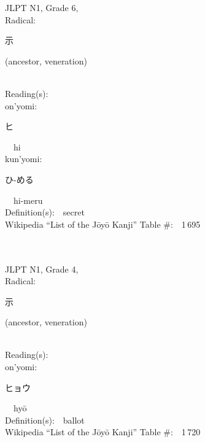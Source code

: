 \begin{multicols}{2}
{JLPT N1, Grade 6, \\Radical:\ \ {\begin{CJK}{UTF8}{min} 示 \end{CJK}} (ancestor, veneration) } \\
Reading(s):\ \ \\
{\hspace*{1em}}on'yomi:\ \ \\
{\hspace*{2em}}{\begin{CJK}{UTF8}{min} ヒ \end{CJK}}\ \ hi\ \ \\
{\hspace*{1em}}kun'yomi:\ \ \\
{\hspace*{2em}}{\begin{CJK}{UTF8}{min} ひ-める \end{CJK}}\ \ hi-meru\ \ \\
Definition(s):\ \ secret \\
Wikipedia ``List of the J\=oy\=o Kanji'' Table \#:\ \ 1\,695 \\
\ \ \\
{\fontsize{34pt}{40pt}  }\ \ \\  %
{JLPT N1, Grade 4, \\Radical:\ \ {\begin{CJK}{UTF8}{min} 示 \end{CJK}} (ancestor, veneration) } \\
Reading(s):\ \ \\
{\hspace*{1em}}on'yomi:\ \ \\
{\hspace*{2em}}{\begin{CJK}{UTF8}{min} ヒョウ \end{CJK}}\ \ hy\=o\ \ \\
Definition(s):\ \ ballot \\
Wikipedia ``List of the J\=oy\=o Kanji'' Table \#:\ \ 1\,720 \\
\ \ \\
{\fontsize{34pt}{40pt}  }\ \ \\  %

\end{multicols}
